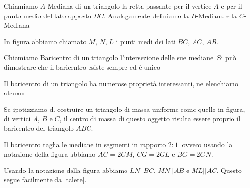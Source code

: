 \documentclass[11pt]{scrartcl}
\begin{document}
	\begin{definition}
		Chiamiamo $A$-Mediana di un triangolo la retta passante per il vertice $A$ e per il punto medio del lato opposto $BC$. Analogamente definiamo la $B$-Mediana e la $C$-Mediana
	\end{definition}
	In figura abbiamo chiamato $M$, $N$, $L$ i punti medi dei lati $BC$, $AC$, $AB$.
	\begin{definition}
		Chiamiamo Baricentro di un triangolo l'intersezione delle sue mediane. Si può dimostrare che il baricentro esiste sempre ed è unico.
	\end{definition}
	Il baricentro di un triangolo ha numerose proprietà interessanti, ne elenchiamo alcune:
	\begin{lemma}
		Se ipotizziamo di costruire un triangolo di massa uniforme come quello in figura, di vertici $A$, $B$ e $C$, il centro di massa di questo oggetto risulta essere proprio il baricentro del triangolo $ABC$.
	\end{lemma}
	\begin{lemma}
		Il baricentro taglia le mediane in segmenti in rapporto $2:1$, ovvero usando la notazione della figura abbiamo $AG=2GM$, $CG=2GL$ e $BG=2GN$.
	\end{lemma}
	\begin{lemma}
		Usando la notazione della figura abbiamo $LN || BC$, $MN || AB$ e $ML || AC$. Questo segue facilmente da \ref{talete}.
	\end{lemma}
\end{document}
